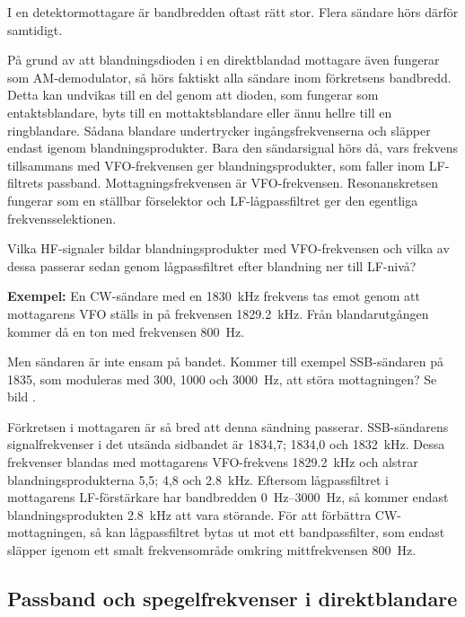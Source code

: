 I en detektormottagare är bandbredden oftast rätt stor.
Flera sändare hörs därför samtidigt.

På grund av att blandningsdioden i en direktblandad mottagare även fungerar
som AM-demodulator, så hörs faktiskt alla sändare inom förkretsens bandbredd.
Detta kan undvikas till en del genom att dioden, som fungerar som
entaktsblandare, byts till en mottaktsblandare eller ännu hellre till en
ringblandare.
Sådana blandare undertrycker ingångsfrekvenserna och släpper endast igenom
blandningsprodukter.
Bara den sändarsignal hörs då, vars frekvens tillsammans med VFO-frekvensen
ger blandningsprodukter, som faller inom LF-filtrets passband.
Mottagningsfrekvensen är VFO-frekvensen.
Resonanskretsen fungerar som en ställbar förselektor och LF-lågpassfiltret
ger den egentliga frekvensselektionen.

Vilka HF-signaler bildar blandningsprodukter med VFO-frekvensen och
vilka av dessa passerar sedan genom lågpassfiltret efter blandning ner
till LF-nivå?

\textbf{Exempel:}
En CW-sändare med en  \qty{1830}{\kilo\hertz} frekvens tas emot genom att
mottagarens VFO ställs in på frekvensen \qty{1829,2}{\kilo\hertz}.
Från blandarutgången kommer då en ton med frekvensen \qty{800}{\hertz}.

Men sändaren är inte ensam på bandet.
Kommer till exempel SSB-sändaren på 1835, som moduleras med 300, 1000 och
\qty{3000}{\hertz}, att störa mottagningen?
Se bild .

Förkretsen i mottagaren är så bred att denna sändning passerar.
SSB-sändarens signalfrekvenser i det utsända sidbandet är 1834,7; 1834,0 och
\qty{1832}{\kilo\hertz}.
Dessa frekvenser blandas med mottagarens VFO-frekvens \qty{1829,2}{\kilo\hertz}
och alstrar blandningsprodukterna 5,5; 4,8 och \qty{2,8}{\kilo\hertz}.
Eftersom lågpassfiltret i mottagarens LF-förstärkare har bandbredden
\SIrange{0}{3000}{\hertz}, så kommer endast blandningsprodukten
\qty{2,8}{\kilo\hertz} att vara störande.
För att förbättra CW-mottagningen, så kan lågpassfiltret bytas ut mot ett
bandpassfilter, som endast släpper igenom ett smalt frekvensområde omkring
mittfrekvensen \qty{800}{\hertz}.

\subsection{Passband och spegelfrekvenser i direktblandare}
\label{passband_spegelfrekvens}

